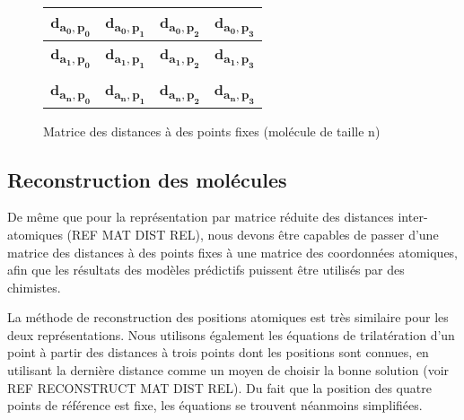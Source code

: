 \begin{figure}[h!]
	\centering
	
	\begin{tabular}{|c|c|c|c|}
		\hline
		\textbf{d\textsubscript{$\mathbf{a_0,p_0}$}} & \textbf{d\textsubscript{$\mathbf{a_0,p_1}$}} & \textbf{d\textsubscript{$\mathbf{a_0,p_2}$}} & \textbf{d\textsubscript{$\mathbf{a_0,p_3}$}} \\ \hline
		\textbf{d\textsubscript{$\mathbf{a_1,p_0}$}} & \textbf{d\textsubscript{$\mathbf{a_1,p_1}$}} & \textbf{d\textsubscript{$\mathbf{a_1,p_2}$}} & \textbf{d\textsubscript{$\mathbf{a_1,p_3}$}} \\ \hline
		\rot{... } & \rot{... } & \rot{... } & \rot{... } \\ \hline
		\textbf{d\textsubscript{$\mathbf{a_n,p_0}$}} & \textbf{d\textsubscript{$\mathbf{a_n,p_1}$}} & \textbf{d\textsubscript{$\mathbf{a_n,p_2}$}} & \textbf{d\textsubscript{$\mathbf{a_n,p_3}$}} \\ \hline
	\end{tabular}
	
	\caption{Matrice des distances à des points fixes (molécule de taille n)}
\end{figure}


\subsection{Reconstruction des molécules}
\par De même que pour la représentation par matrice réduite des distances inter-atomiques (REF MAT DIST REL), nous devons être capables de passer d'une matrice des distances à des points fixes à une matrice des coordonnées atomiques, afin que les résultats des modèles prédictifs puissent être utilisés par des chimistes.\\

\par La méthode de reconstruction des positions atomiques est très similaire pour les deux représentations. Nous utilisons également les équations de trilatération d'un point à partir des distances à trois points dont les positions sont connues, en utilisant la dernière distance comme un moyen de choisir la bonne solution (voir REF RECONSTRUCT MAT DIST REL). Du fait que la position des quatre points de référence est fixe, les équations se trouvent néanmoins simplifiées.